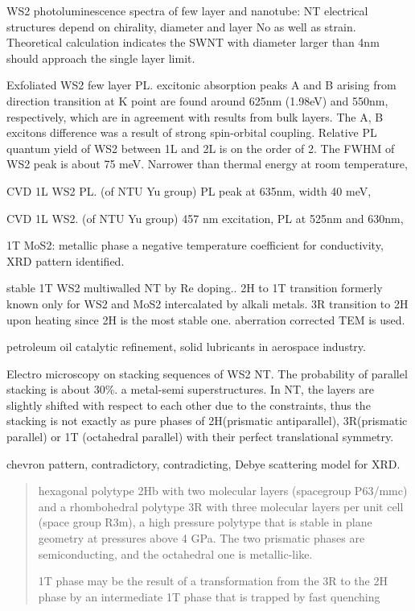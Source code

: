 WS2 photoluminescence spectra of few layer and nanotube:
NT electrical structures depend on chirality, diameter and layer No as well as strain. Theoretical calculation indicates the SWNT with diameter larger than 4nm should approach the single layer limit.\cite{Ghorbani-Asl2013}

Exfoliated WS2 few layer PL.\cite{Zhao2012} excitonic absorption peaks A and B arising from direction transition at K point are found around 625nm (1.98eV) and 550nm, respectively, which are in agreement with results from bulk layers. The A, B excitons difference was a result of strong spin-orbital coupling. Relative PL quantum yield of WS2 between 1L and 2L is on the order of 2. The FWHM of WS2 peak is about 75 meV. Narrower than thermal energy at room temperature,

CVD 1L WS2 PL.\cite{Peimyoo2013} (of NTU Yu group) PL peak at 635nm, width 40 meV, 

CVD 1L WS2.\cite{Cong2013} (of NTU Yu group) 457 nm excitation, PL at 525nm and 630nm, 

\cite{Xiao2014}

1T MoS2: metallic phase a negative temperature coefficient for conductivity, XRD pattern identified. \cite{Wypych1992}

stable 1T WS2 multiwalled NT by Re doping.\cite{Enyashin2011}. 2H to 1T transition formerly known only for WS2 and MoS2 intercalated by alkali metals. 3R transition to 2H upon heating since 2H is the most stable one.
aberration corrected TEM is used.

petroleum oil catalytic refinement, solid lubricants in aerospace industry.

Electro microscopy on stacking sequences of WS2 NT.\cite{Houben2012} The probability of parallel stacking is about 30\%. a metal-semi superstructures. In NT, the layers are slightly shifted with respect to each other due to the constraints, thus the stacking is not exactly as pure phases of 2H(prismatic antiparallel), 3R(prismatic parallel) or 1T (octahedral parallel) with their perfect translational symmetry.

chevron pattern, contradictory, contradicting, Debye scattering model for XRD.

\begin{quote}
hexagonal polytype 2Hb with two molecular layers (spacegroup P63/mmc) and a rhombohedral polytype 3R with three molecular layers per unit cell (space group R3m), a high pressure polytype that is stable in plane geometry at pressures above 4 GPa. The two prismatic phases are semiconducting, and the octahedral one is metallic-like.

1T phase may be the result of a transformation from the 3R to the 2H phase by an intermediate 1T phase that is trapped by fast quenching

\end{quote}


